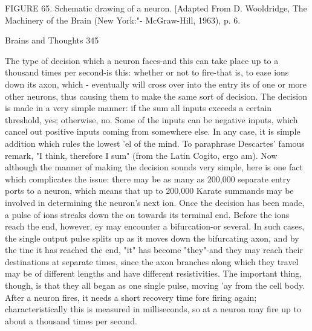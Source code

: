 FIGURE 65. Schematic drawing of a neuron. [Adapted From D. Wooldridge, The
Machinery of the Brain (New York:"- McGraw-Hill, 1963), p. 6.


Brains and Thoughts                                                                      345

The type of decision which a neuron faces-and this can take place up to a thousand times
per second-is this: whether or not to fire-that is, to ease ions down its axon, which -
eventually will cross over into the entry its of one or more other neurons, thus causing
them to make the same sort of decision. The decision is made in a very simple manner: if
the sum all inputs exceeds a certain threshold, yes; otherwise, no. Some of the inputs can
be negative inputs, which cancel out positive inputs coming from somewhere else. In any
case, it is simple addition which rules the lowest 'el of the mind. To paraphrase Descartes'
famous remark, "I think, therefore I sum" (from the Latin Cogito, ergo am).
         Now although the manner of making the decision sounds very simple, here is one
fact which complicates the issue: there may be as many as 200,000 separate entry ports to
a neuron, which means that up to 200,000 Karate summands may be involved in
determining the neuron's next ion. Once the decision has been made, a pulse of ions
streaks down the on towards its terminal end. Before the ions reach the end, however, ey
may encounter a bifurcation-or several. In such cases, the single output pulse splits up as
it moves down the bifurcating axon, and by the tine it has reached the end, "it" has
become "they"-and they may reach their destinations at separate times, since the axon
branches along which they travel may be of different lengths and have different
resistivities. The important thing, though, is that they all began as one single pulse,
moving 'ay from the cell body. After a neuron fires, it needs a short recovery time fore
firing again; characteristically this is measured in milliseconds, so at a neuron may fire up
to about a thousand times per second.

